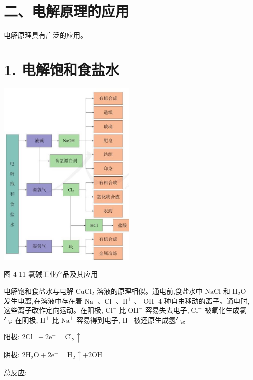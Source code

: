 \documentclass[10pt]{article}
\begin{document}
\section*{二、电解原理的应用}

电解原理具有广泛的应用。

\section*{1. 电解饱和食盐水}

\begin{center}
\includegraphics[max width=0.5\textwidth]{images/0190da9d-8bfd-732f-bc2c-0b21d0f13b91_111_133513.jpg}
\end{center}

图 4-11 氯碱工业产品及其应用

电解饱和食盐水与电解 \({\mathrm{{CuCl}}}_{2}\) 溶液的原理相似。通电前,食盐水中 \(\mathrm{{NaCl}}\) 和 \({\mathrm{H}}_{2}\mathrm{O}\) 发生电离,在溶液中存在着 \({\mathrm{{Na}}}^{ + }\text{、}{\mathrm{{Cl}}}^{ - }\text{、}{\mathrm{H}}^{ + }\) 、 \({\mathrm{{OH}}}^{ - }4\) 种自由移动的离子。通电时,这些离子改作定向运动。在阳极, \({\mathrm{{Cl}}}^{ - }\) 比 \({\mathrm{{OH}}}^{ - }\) 容易失去电子, \({\mathrm{{Cl}}}^{ - }\) 被氧化生成氯气; 在阴极, \({\mathrm{H}}^{ + }\) 比 \({\mathrm{{Na}}}^{ + }\) 容易得到电子, \({\mathrm{H}}^{ + }\) 被还原生成氢气。

阳极: \(2{\mathrm{{Cl}}}^{ - } - 2{\mathrm{e}}^{ - } = {\mathrm{{Cl}}}_{2} \uparrow\)

阴极: \(2{\mathrm{H}}_{2}\mathrm{O} + 2{\mathrm{e}}^{ - } = {\mathrm{H}}_{2} \uparrow + 2{\mathrm{{OH}}}^{ - }\)

总反应:
\end{document}
